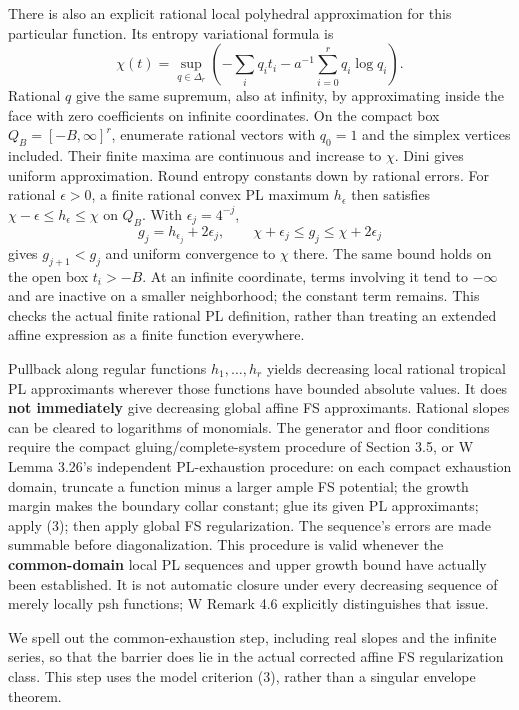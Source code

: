 \documentclass[
  11pt,
]{article}
\begin{document}
There is also an explicit rational local polyhedral approximation for
this particular function. Its entropy variational formula is
\[\chi(t)=\sup_{q\in\Delta_r}
 \left(-\sum_i q_i t_i-a^{-1}\sum_{i=0}^r q_i\log q_i\right).\tag{14}\]
Rational \(q\) give the same supremum, also at infinity, by
approximating inside the face with zero coefficients on infinite
coordinates. On the compact box \(Q_B=[-B,\infty]^r\), enumerate
rational vectors with \(q_0=1\) and the simplex vertices included. Their
finite maxima are continuous and increase to \(\chi\). Dini gives
uniform approximation. Round entropy constants down by rational errors.
For rational \(\epsilon>0\), a finite rational convex PL maximum
\(h_\epsilon\) then satisfies \(\chi-\epsilon\leq h_\epsilon\leq\chi\)
on \(Q_B\). With \(\epsilon_j=4^{-j}\),
\[g_j=h_{\epsilon_j}+2\epsilon_j,\qquad
 \chi+\epsilon_j\leq g_j\leq\chi+2\epsilon_j\] gives \(g_{j+1}<g_j\) and
uniform convergence to \(\chi\) there. The same bound holds on the open
box \(t_i>-B\). At an infinite coordinate, terms involving it tend to
\(-\infty\) and are inactive on a smaller neighborhood; the constant
term remains. This checks the actual finite rational PL definition,
rather than treating an extended affine expression as a finite function
everywhere.

Pullback along regular functions \(h_1,\ldots,h_r\) yields decreasing
local rational tropical PL approximants wherever those functions have
bounded absolute values. It does \textbf{not immediately} give
decreasing global affine FS approximants. Rational slopes can be cleared
to logarithms of monomials. The generator and floor conditions require
the compact gluing/complete-system procedure of Section 3.5, or W Lemma
3.26's independent PL-exhaustion procedure: on each compact exhaustion
domain, truncate a function minus a larger ample FS potential; the
growth margin makes the boundary collar constant; glue its given PL
approximants; apply (3); then apply global FS regularization. The
sequence's errors are made summable before diagonalization. This
procedure is valid whenever the \textbf{common-domain} local PL
sequences and upper growth bound have actually been established. It is
not automatic closure under every decreasing sequence of merely locally
psh functions; W Remark 4.6 explicitly distinguishes that issue.

We spell out the common-exhaustion step, including real slopes and the
infinite series, so that the barrier does lie in the actual corrected
affine FS regularization class. This step uses the model criterion (3),
rather than a singular envelope theorem.
\end{document}
